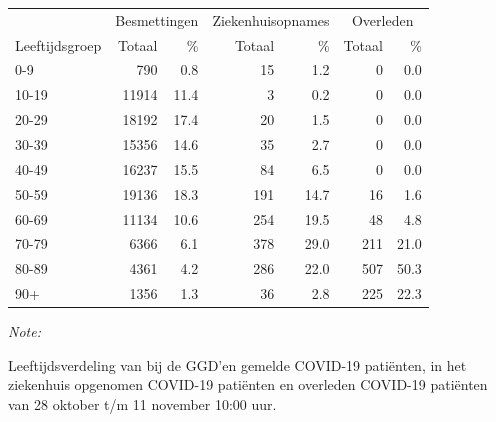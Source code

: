 \documentclass[
  english,
  man,floatsintext]{apa6}
\begin{document}
\begin{table}[H]
\centering\begingroup\fontsize{11}{13}\selectfont

\begin{threeparttable}
\begin{tabular}{lrrrrrr}
\toprule
\multicolumn{1}{c}{ } & \multicolumn{2}{c}{Besmettingen} & \multicolumn{2}{c}{Ziekenhuisopnames} & \multicolumn{2}{c}{Overleden} \\
\cmidrule(l{3pt}r{3pt}){2-3} \cmidrule(l{3pt}r{3pt}){4-5} \cmidrule(l{3pt}r{3pt}){6-7}
Leeftijdsgroep & Totaal & \% & Totaal & \% & Totaal & \%\\
\midrule
0-9 & 790 & 0.8 & 15 & 1.2 & 0 & 0.0\\
10-19 & 11914 & 11.4 & 3 & 0.2 & 0 & 0.0\\
20-29 & 18192 & 17.4 & 20 & 1.5 & 0 & 0.0\\
30-39 & 15356 & 14.6 & 35 & 2.7 & 0 & 0.0\\
40-49 & 16237 & 15.5 & 84 & 6.5 & 0 & 0.0\\
50-59 & 19136 & 18.3 & 191 & 14.7 & 16 & 1.6\\
60-69 & 11134 & 10.6 & 254 & 19.5 & 48 & 4.8\\
70-79 & 6366 & 6.1 & 378 & 29.0 & 211 & 21.0\\
80-89 & 4361 & 4.2 & 286 & 22.0 & 507 & 50.3\\
90+ & 1356 & 1.3 & 36 & 2.8 & 225 & 22.3\\
\bottomrule
\end{tabular}
\begin{tablenotes}
\item \textit{Note: } 
\item Leeftijdsverdeling van bij de GGD’en gemelde COVID-19 patiënten, in het ziekenhuis opgenomen COVID-19 patiënten en overleden COVID-19 patiënten van 28 oktober t/m 11 november 10:00 uur.
\end{tablenotes}
\end{threeparttable}
\endgroup{}
\end{table}
\end{document}
